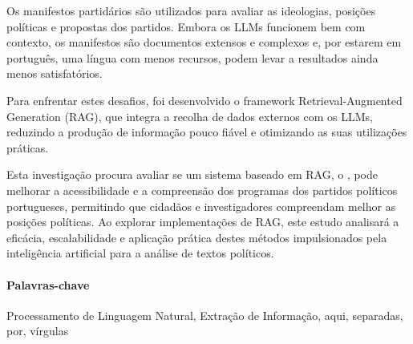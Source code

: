 Os manifestos partidários são utilizados para avaliar as ideologias, posições políticas e propostas dos partidos. Embora os LLMs funcionem bem com contexto, os manifestos são documentos extensos e complexos e, por estarem em português, uma língua com menos recursos, podem levar a resultados ainda menos satisfatórios.

Para enfrentar estes desafios, foi desenvolvido o framework Retrieval-Augmented Generation (RAG), que integra a recolha de dados externos com os LLMs, reduzindo a produção de informação pouco fiável e otimizando as suas utilizações práticas.

Esta investigação procura avaliar se um sistema baseado em RAG, o \sysname{}, pode melhorar a acessibilidade e a compreensão dos programas dos partidos políticos portugueses, permitindo que cidadãos e investigadores compreendam melhor as posições políticas. Ao explorar implementações de RAG, este estudo analisará a eficácia, escalabilidade e aplicação prática destes métodos impulsionados pela inteligência artificial para a análise de textos políticos.

\paragraph{Palavras-chave} Processamento de Linguagem Natural, Extração de Informação, aqui, separadas, por, vírgulas

\cleardoublepage
